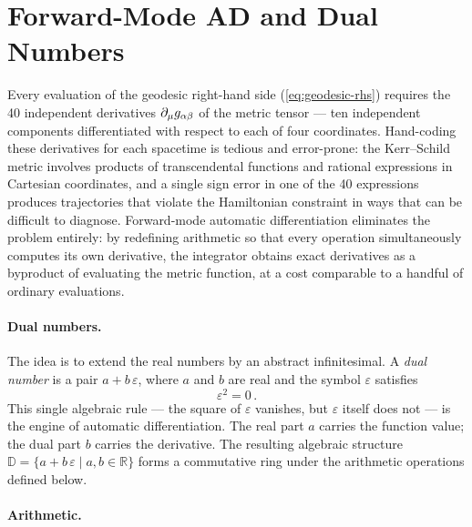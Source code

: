 \section{Forward-Mode AD and Dual Numbers}
\label{sec:ad-forward}

Every evaluation of the geodesic right-hand side
(\cref{eq:geodesic-rhs}) requires the 40 independent
derivatives $\partial_{\mu} g_{\alpha\beta}$ of the metric
tensor --- ten independent components differentiated with
respect to each of four coordinates.
Hand-coding these derivatives for each spacetime is tedious
and error-prone: the Kerr--Schild metric involves products of
transcendental functions and rational expressions in
Cartesian coordinates, and a single sign error in one of the
40 expressions produces trajectories that violate the
Hamiltonian constraint in ways that can be difficult to
diagnose.  Forward-mode automatic differentiation eliminates
the problem entirely:
by redefining arithmetic so that every
operation simultaneously computes its own derivative, the
integrator obtains exact derivatives as a byproduct of
evaluating the metric function, at a cost comparable to a
handful of ordinary evaluations.

\paragraph{Dual numbers.}

The idea is to extend the real numbers by an abstract
infinitesimal.  A \emph{dual number} is a pair
$a + b\,\varepsilon$, where $a$ and $b$ are real and the
symbol $\varepsilon$ satisfies
%
\begin{equation}
  \varepsilon^2 = 0 \,.
  \label{eq:dual-epsilon}
\end{equation}
%
This single algebraic rule --- the square of $\varepsilon$
vanishes, but $\varepsilon$ itself does not --- is the
engine of automatic differentiation.  The real part $a$
carries the function value; the dual part $b$ carries the
derivative.  The resulting algebraic structure
$\mathbb{D} = \{a + b\,\varepsilon \mid a, b \in \mathbb{R}\}$
forms a commutative ring under the arithmetic operations
defined below.

\paragraph{Arithmetic.}

